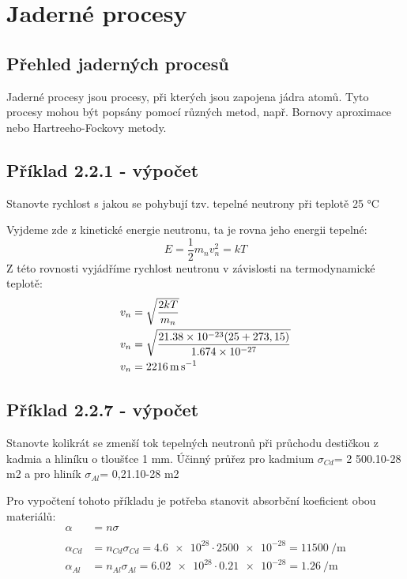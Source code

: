 \section{Jaderné procesy}

\subsection{Přehled jaderných procesů}

Jaderné procesy jsou procesy, při kterých jsou zapojena jádra atomů. Tyto procesy mohou být popsány pomocí různých metod, např. Bornovy aproximace nebo Hartreeho-Fockovy metody.

\subsection{Příklad 2.2.1 - výpočet}
\begin{zadani}
    Stanovte rychlost s jakou se pohybují  tzv. tepelné neutrony
    při teplotě 25 °C 
\end{zadani}

Vyjdeme zde z kinetické energie neutronu, ta je rovna jeho energii tepelné:
\[
    E=\frac{1}{2}m_{n} v_{n}^{2}=kT 
\]
Z této rovnosti vyjádříme rychlost neutronu v závislosti na termodynamické teplotě:
\begin{align*}
  v_{n} &= \sqrt{\frac{2kT}{m_{n}}} \\ 
  v_{n} &= \sqrt{\frac{2\num{1.38e-23}(25+273,15)}{\num{1,674e-27}}} \\ 
  v_{n} &= \qty{2216}{\meter\per\second}
\end{align*}


\subsection{Příklad 2.2.7 - výpočet}
\begin{zadani}
    Stanovte kolikrát se zmenší tok tepelných neutronů při průchodu
    destičkou z kadmia a hliníku o tloušťce 1 mm. Účinný průřez pro
    kadmium  \(\sigma_{Cd} \)= 2 500.10-28 m2  a pro hliník  \(\sigma_{Al} \)= 0,21.10-28 m2 
\end{zadani}

Pro vypočtení tohoto příkladu je potřeba stanovit absorbční koeficient obou materiálů:
\begin{align*}
    \alpha &= n\sigma \\\\
    \alpha_{Cd}  &= n_{Cd} \sigma_{Cd} = \num{4,6e28}\cdot \num{2500e-28}= \qty{11500}{\per\meter}\\
    \alpha_{Al}  &= n_{Al} \sigma_{Al} = \num{6,02e28}\cdot \num{0,21e-28}= \qty{1,26}{\per\meter}
\end{align*}

